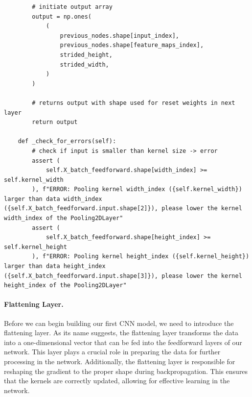 \documentclass[%
oneside,                 %
final,                   %
10pt]{article}
\begin{document}
\begin{verbatim}
        # initiate output array
        output = np.ones(
            (
                previous_nodes.shape[input_index],
                previous_nodes.shape[feature_maps_index],
                strided_height,
                strided_width,
            )
        )

        # returns output with shape used for reset weights in next layer
        return output

    def _check_for_errors(self):
        # check if input is smaller than kernel size -> error
        assert (
            self.X_batch_feedforward.shape[width_index] >= self.kernel_width
        ), f"ERROR: Pooling kernel width_index ({self.kernel_width}) larger than data width_index ({self.X_batch_feedforward.input.shape[2]}), please lower the kernel width_index of the Pooling2DLayer"
        assert (
            self.X_batch_feedforward.shape[height_index] >= self.kernel_height
        ), f"ERROR: Pooling kernel height_index ({self.kernel_height}) larger than data height_index ({self.X_batch_feedforward.input.shape[3]}), please lower the kernel height_index of the Pooling2DLayer"

\end{verbatim}


\paragraph{Flattening Layer.}
Before we can begin building our first CNN model, we need to introduce
the flattening layer. As its name suggests, the flattening layer
transforms the data into a one-dimensional vector that can be fed into
the feedforward layers of our network. This layer plays a crucial role
in preparing the data for further processing in the
network. Additionally, the flattening layer is responsible for
reshaping the gradient to the proper shape during
backpropagation. This ensures that the kernels are correctly updated,
allowing for effective learning in the network.
\end{document}
